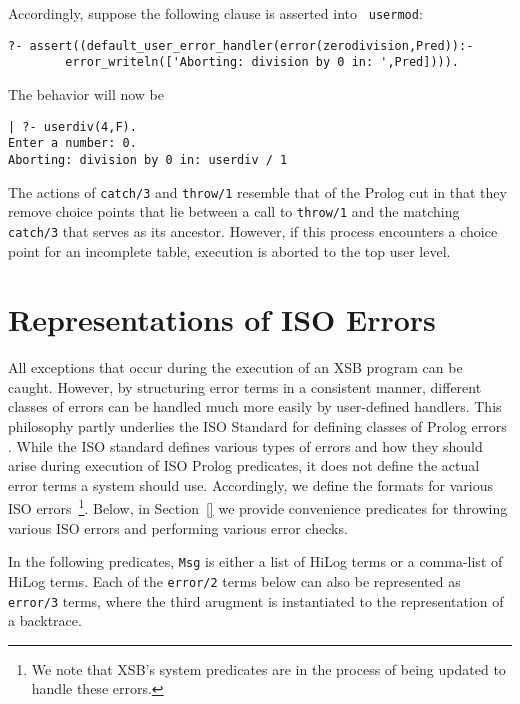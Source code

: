 Accordingly, suppose the following clause is asserted into {\tt
usermod}:
%
\begin{small}
\begin{verbatim}
?- assert((default_user_error_handler(error(zerodivision,Pred)):- 
        error_writeln(['Aborting: division by 0 in: ',Pred]))).
\end{verbatim}
\end{small}
%
The behavior will now be
\begin{small}
\begin{verbatim}
| ?- userdiv(4,F).
Enter a number: 0.
Aborting: division by 0 in: userdiv / 1
\end{verbatim}
\end{small}
The actions of {\tt catch/3} and {\tt throw/1} resemble that of the
Prolog cut in that they remove choice points that lie between a call
to {\tt throw/1} and the matching {\tt catch/3} that serves as its
ancestor.  However, if this process encounters a choice point for an
incomplete table, execution is aborted to the top user level.

\section{Representations of ISO Errors} \label{sec:iso-errors}

All exceptions that occur during the execution of an XSB program can
be caught.  However, by structuring error terms in a consistent
manner, different classes of errors can be handled much more easily by
user-defined handlers.  This philosophy partly underlies the ISO
Standard for defining classes of Prolog errors \cite{ISO-Prolog}.
While the ISO standard defines various types of errors and how they
should arise during execution of ISO Prolog predicates, it does not
define the actual error terms a system should use.  Accordingly, we
define the formats for various ISO errors~\footnote{We note that XSB's
system predicates are in the process of being updated to handle these
errors.}.  Below, in Section~\ref{} we provide convenience predicates
for throwing various ISO errors and performing various error checks.

In the following predicates, {\tt Msg} is either a list of HiLog terms
or a comma-list of HiLog terms.  Each of the {\tt error/2} terms below
can also be represented as {\tt error/3} terms, where the third
arugment is instantiated to the representation of a backtrace.

